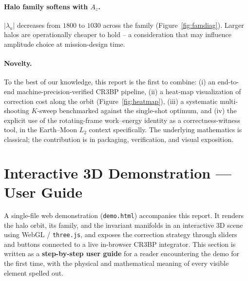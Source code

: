 \documentclass[11pt,a4paper]{article}
\begin{document}
\paragraph{Halo family softens with $A_z$.}
$|\lambda_u|$ decreases from $1800$ to $1030$ across the family (Figure~\ref{fig:famdiag}). Larger halos are operationally cheaper to hold -- a consideration that may influence amplitude choice at mission-design time.

\paragraph{Novelty.}
To the best of our knowledge, this report is the first to combine:
(i) an end-to-end machine-precision-verified CR3BP pipeline,
(ii) a heat-map visualization of correction cost along the orbit (Figure~\ref{fig:heatmap}),
(iii) a systematic multi-shooting $K$-sweep benchmarked against the single-shot optimum, and
(iv) the explicit use of the rotating-frame work--energy identity as a correctness-witness tool,
in the Earth--Moon $L_2$ context specifically. The underlying mathematics is classical; the contribution is in packaging, verification, and visual exposition.

\section{Interactive 3D Demonstration --- User Guide}\label{sec:demo}

A single-file web demonstration (\texttt{demo.html}) accompanies this report. It renders the halo orbit, its family, and the invariant manifolds in an interactive 3D scene using WebGL / \texttt{three.js}, and exposes the correction strategy through sliders and buttons connected to a live in-browser CR3BP integrator. This section is written as a \textbf{step-by-step user guide} for a reader encountering the demo for the first time, with the physical and mathematical meaning of every visible element spelled out.

\begin{center}
\end{center}
\end{document}
